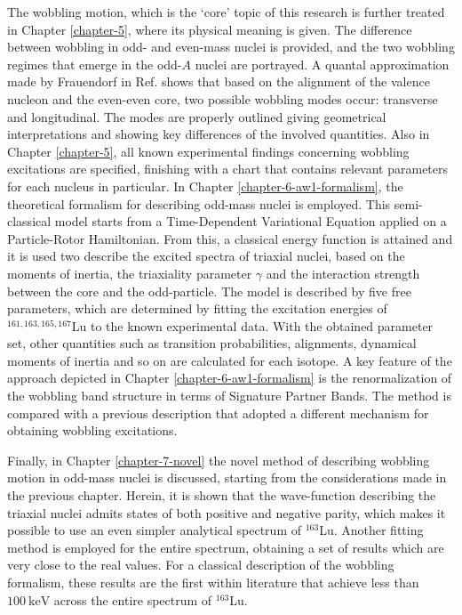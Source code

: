 The wobbling motion, which is the `core' topic of this research is further treated in Chapter \ref{chapter-5}, where its physical meaning is given. The difference between wobbling in odd- and even-mass nuclei is provided, and the two wobbling regimes that emerge in the odd-$A$ nuclei are portrayed. A quantal approximation made by Frauendorf in Ref. \cite{frauendorf2014transverse} shows that based on the alignment of the valence nucleon and the even-even core, two possible wobbling modes occur: transverse and longitudinal. The modes are properly outlined giving geometrical interpretations and showing key differences of the involved quantities. Also in Chapter \ref{chapter-5}, all known experimental findings concerning wobbling excitations are specified, finishing with a chart that contains relevant parameters for each nucleus in particular. In Chapter \ref{chapter-6-aw1-formalism}, the theoretical formalism for describing odd-mass nuclei is employed. This semi-classical model starts from a Time-Dependent Variational Equation applied on a Particle-Rotor Hamiltonian. From this, a classical energy function is attained and it is used two describe the excited spectra of triaxial nuclei, based on the moments of inertia, the triaxiality parameter $\gamma$ and the interaction strength between the core and the odd-particle. The model is described by five free parameters, which are determined by fitting the excitation energies of $^{161,163,165,167}$Lu to the known experimental data. With the obtained parameter set, other quantities such as transition probabilities, alignments, dynamical moments of inertia and so on are calculated for each isotope. A key feature of the approach depicted in Chapter \ref{chapter-6-aw1-formalism} is the renormalization of the wobbling band structure in terms of Signature Partner Bands. The method is compared with a previous description that adopted a different mechanism for obtaining wobbling excitations.

Finally, in Chapter \ref{chapter-7-novel} the novel method of describing wobbling motion in odd-mass nuclei is discussed, starting from the considerations made in the previous chapter. Herein, it is shown that the wave-function describing the triaxial nuclei admits states of both positive and negative parity, which makes it possible to use an even simpler analytical spectrum of $^{163}$Lu. Another fitting method is employed for the entire spectrum, obtaining a set of results which are very close to the real values. For a classical description of the wobbling formalism, these results are the first within literature that achieve less than $100\ \text{keV}$ across the entire spectrum of $^{163}$Lu.